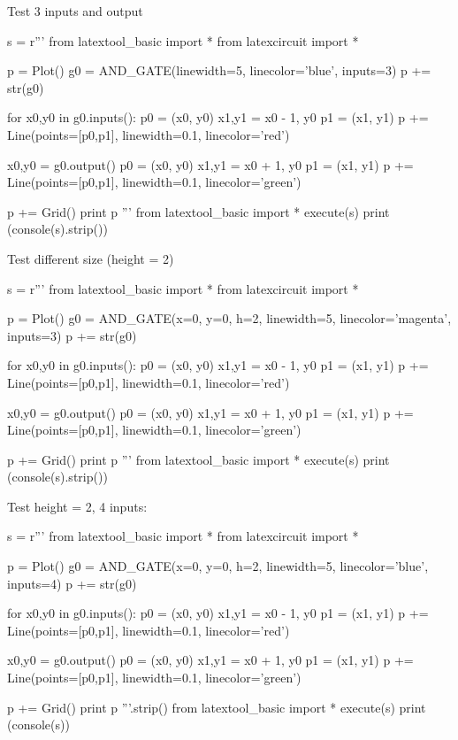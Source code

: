 Test 3 inputs and output
\begin{python}
s = r'''
from latextool_basic import *
from latexcircuit import *

p = Plot()
g0 = AND_GATE(linewidth=5, linecolor='blue', inputs=3)
p += str(g0)

for x0,y0 in g0.inputs():
    p0 = (x0, y0)
    x1,y1 = x0 - 1, y0
    p1 = (x1, y1)
    p += Line(points=[p0,p1], linewidth=0.1, linecolor='red')

x0,y0 = g0.output()
p0 = (x0, y0)
x1,y1 = x0 + 1, y0
p1 = (x1, y1)
p += Line(points=[p0,p1], linewidth=0.1, linecolor='green')

p += Grid()
print p
'''
from latextool_basic import *
execute(s)
print (console(s).strip())
\end{python}
  





Test different size (height = 2)
\begin{python}
s = r'''
from latextool_basic import *
from latexcircuit import *

p = Plot()
g0 = AND_GATE(x=0, y=0, h=2,
              linewidth=5, linecolor='magenta', inputs=3)
p += str(g0)

for x0,y0 in g0.inputs():
    p0 = (x0, y0)
    x1,y1 = x0 - 1, y0
    p1 = (x1, y1)
    p += Line(points=[p0,p1], linewidth=0.1, linecolor='red')

x0,y0 = g0.output()
p0 = (x0, y0)
x1,y1 = x0 + 1, y0
p1 = (x1, y1)
p += Line(points=[p0,p1], linewidth=0.1, linecolor='green')

p += Grid()
print p
'''
from latextool_basic import *
execute(s)
print (console(s).strip())
\end{python}





Test height = 2, 4 inputs:
\begin{python}
s = r'''
from latextool_basic import *
from latexcircuit import *

p = Plot()
g0 = AND_GATE(x=0, y=0, h=2,
              linewidth=5, linecolor='blue', inputs=4)
p += str(g0)

for x0,y0 in g0.inputs():
    p0 = (x0, y0)
    x1,y1 = x0 - 1, y0
    p1 = (x1, y1)
    p += Line(points=[p0,p1], linewidth=0.1, linecolor='red')

x0,y0 = g0.output()
p0 = (x0, y0)
x1,y1 = x0 + 1, y0
p1 = (x1, y1)
p += Line(points=[p0,p1], linewidth=0.1, linecolor='green')

p += Grid()
print p
'''.strip()
from latextool_basic import *
execute(s)
print (console(s))
\end{python}


